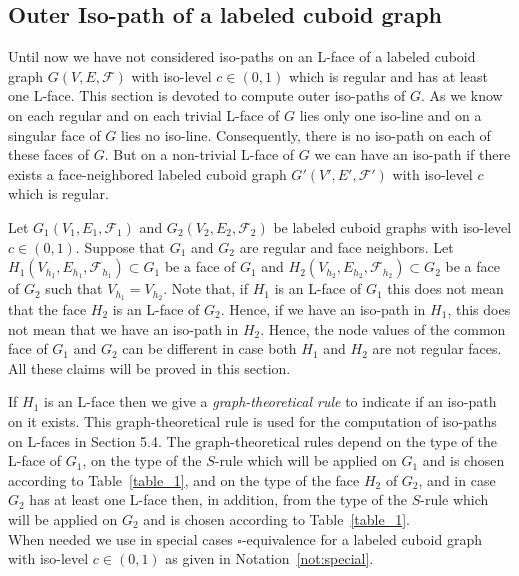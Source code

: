 \documentclass[a4paper,11pt]{article}
\begin{document}
\subsection{Outer Iso-path of a labeled cuboid graph}
Until now we have not considered iso-paths on an L-face of a labeled cuboid graph $G(V,E,\mathcal{F})$ with
iso-level $c\in (0,1)$ which is regular and has at least one L-face. This section is devoted to compute
outer iso-paths of $G$. As we know on each regular and on each trivial L-face of $G$ lies only one iso-line
and on a singular face of $G$ lies no iso-line. Consequently, there is no iso-path on each of these faces
of $G$. But on a non-trivial L-face of $G$ we can have an iso-path if there exists a face-neighbored
labeled cuboid graph $G'(V',E',\mathcal{F}')$ with iso-level $c$ which is regular.

Let $G_1(V_1,E_1,\mathcal{F}_1)$ and $G_2(V_2,E_2,\mathcal{F}_2)$ be labeled cuboid graphs with iso-level
$c\in (0,1)$. Suppose that $G_1$ and $G_2$ are regular and face neighbors. Let $H_1(V_{h_1},E_{h_1},
\mathcal{F}_{h_1})\subset G_1$ be a face of $G_1$ and $H_2(V_{h_2},E_{h_2},\mathcal{F}_{h_2})\subset G_2$ be
a face of $G_2$ such that $V_{h_1}=V_{h_2}$. Note that, if $H_1$ is an L-face of $G_1$ this does not mean
that the face $H_2$ is an L-face of $G_2$. Hence, if we have an iso-path in $H_1$, this does not mean that
we have an iso-path in $H_2$. Hence, the node values of the common face of $G_1$ and $G_2$ can be different
in case both $H_1$ and $H_2$ are not regular faces. All these claims will be proved in this section.

If $H_1$ is an L-face then we give a {\it graph-theoretical rule} to indicate if an iso-path on it exists.
This graph-theoretical rule is used for the computation of iso-paths on L-faces in Section 5.4. The
graph-theoretical rules depend on the type of the L-face of $G_1$, on the type of the $S$-rule
which will be applied on $G_1$ and is chosen according to Table~\ref{table_1}, and on the type of the face
$H_2$ of $G_2$, and in case $G_2$ has at least one L-face then, in addition, from the type of the $S$-rule
which will be applied on $G_2$ and is chosen according to Table~\ref{table_1}.\\

When needed we use in special cases $\square$-equivalence for a labeled cuboid graph
with iso-level $c\in (0,1)$ as given in Notation~\ref{not:special}.
\end{document}
